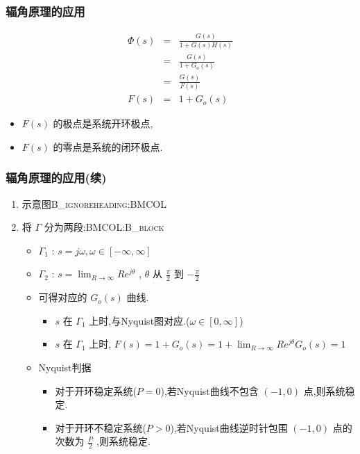 \documentclass[table]{beamer}
\begin{document}
\subsubsection{辐角原理的应用}
\label{sec:orgd602d17}
\begin{eqnarray*}
\Phi(s) &= &\frac{G(s)}{1+G(s)H(s)} \\
       &=&\frac{G(s)}{1+G_o(s)} \\
       &=&\frac{G(s)}{F(s)} \\
 F(s)&=&1+G_o(s)
\end{eqnarray*}
\begin{itemize}
\item \(F(s)\)  的极点是系统开环极点,
\item \(F(s)\)  的零点是系统的闭环极点.
\end{itemize}

\subsubsection{辐角原理的应用(续)}
\label{sec:org7d043d0}
\begin{enumerate}
\item 示意图\hfill{}\textsc{B\_ignoreheading:BMCOL}
\label{sec:orgb1a9cc7}

\item 将 \(\Gamma\) 分为两段:\hfill{}\textsc{BMCOL:B\_block}
\label{sec:org99dae01}
\begin{itemize}
\item \(\Gamma_1\) : \(s=j\omega,\omega\in[-\infty,\infty]\)
\item \(\Gamma_2\) : \(s=\lim_{R\rightarrow\infty}Re^{j\theta}\) , \(\theta\) 从 \(\frac{\pi}{2}\) 到 \(-\frac{\pi}{2}\)
\item 可得对应的 \(G_o(s)\) 曲线.
\begin{itemize}
\item \(s\) 在 \(\Gamma_1\) 上时,与Nyquist图对应.(\(\omega\in[0,\infty]\))
\item \(s\) 在 \(\Gamma_1\) 上时, \(F(s)=1+G_o(s)=1+\lim_{R\rightarrow\infty}Re^{j\theta}G_o(s)=1\)
\end{itemize}
\item <3-> Nyquist判据
\begin{itemize}
\item 对于开环稳定系统(\(P=0\)),若Nyquist曲线不包含 \((-1,0)\) 点,则系统稳定.
\item 对于开环不稳定系统(\(P>0\)),若Nyquist曲线逆时针包围 \((-1,0)\) 点的次数为 \(\frac{P}{2}\) ,则系统稳定.
\end{itemize}
\end{itemize}
\end{enumerate}
\end{document}
